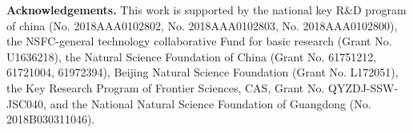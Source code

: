 \documentclass{article}
\begin{document}
\vspace{+4.5mm}
{\parindent0pt %

\textbf{Acknowledgements.} This work is supported by the national key R\&D program of china (No. 2018AAA0102802, No. 2018AAA0102803, No. 2018AAA0102800), the NSFC-general technology collaborative Fund for basic research (Grant No. U1636218), the Natural Science Foundation of China (Grant No. 61751212, 61721004, 61972394), Beijing Natural Science Foundation (Grant No. L172051), the Key Research Program of Frontier Sciences, CAS, Grant No. QYZDJ-SSW-JSC040, and the National Natural Science Foundation of Guangdong (No. 2018B030311046).

}%
\newpage

\end{document}
